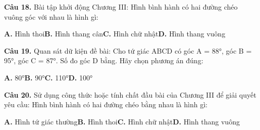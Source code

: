 \documentclass[11pt,a4paper]{article}
\begin{document}
\textbf{\color{primary} Câu 18.} Bài tập khởi động Chương III: Hình bình hành có hai đường chéo vuông góc với nhau là hình gì:\par
\hspace*{1.5em}\textbf{A.} Hình thoi\quad\quad \textbf{B.} Hình thang cân\quad\quad \textbf{C.} Hình chữ nhật\quad\quad \textbf{D.} Hình thang vuông\par\vspace{2pt}
\textbf{\color{primary} Câu 19.} Quan sát dữ kiện đề bài: Cho tứ giác ABCD có góc A = 88°, góc B = 95°, góc C = 87°. Số đo góc D bằng. Hãy chọn phương án đúng:\par
\hspace*{1.5em}\textbf{A.} 80°\quad\quad \textbf{B.} 90°\quad\quad \textbf{C.} 110°\quad\quad \textbf{D.} 100°\par\vspace{2pt}
\textbf{\color{primary} Câu 20.} Sử dụng công thức hoặc tính chất đầu bài của Chương III để giải quyết yêu cầu: Hình bình hành có hai đường chéo bằng nhau là hình gì:\par
\hspace*{1.5em}\textbf{A.} Hình tứ giác thường\quad\quad \textbf{B.} Hình thoi\quad\quad \textbf{C.} Hình chữ nhật\quad\quad \textbf{D.} Hình thang vuông\par\vspace{2pt}
\end{document}
